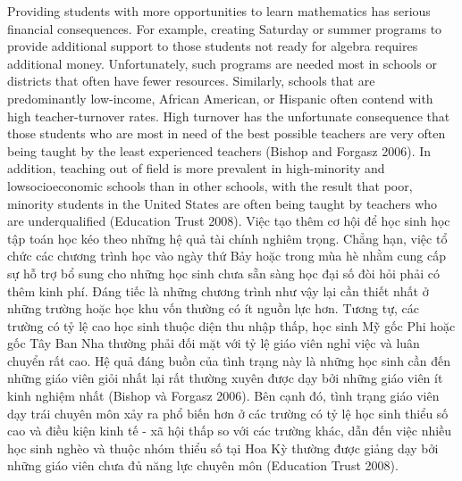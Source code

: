 \documentclass[
  10pt,
  a4paper,
  landscape,
  twoside,
  openany
]{scrbook}
\newcommand{\EN}[1]{#1}
\newcommand{\VI}[1]{#1}
\newcommand{\NOTE}[1]{#1}
\newcounter{example}
\begin{document}
\TriPara
{
\EN{Providing students with more opportunities to learn mathematics has serious financial consequences. For example, creating Saturday or summer programs to provide additional support to those students not ready for algebra requires additional money. Unfortunately, such programs are needed most in schools or districts that often have fewer resources. Similarly, schools that are predominantly low-income, African American, or Hispanic often contend with high teacher-turnover rates. High turnover has the unfortunate consequence that those students who are most in need of the best possible teachers are very often being taught by the least experienced teachers (Bishop and Forgasz 2006). In addition, teaching out of field is more prevalent in high-minority and lowsocioeconomic schools than in other schools, with the result that poor, minority students in the United States are often being taught by teachers who are underqualified (Education Trust 2008).}
}
{
\VI{Việc tạo thêm cơ hội để học sinh học tập toán học kéo theo những hệ quả tài chính nghiêm trọng. Chẳng hạn, việc tổ chức các chương trình học vào ngày thứ Bảy hoặc trong mùa hè nhằm cung cấp sự hỗ trợ bổ sung cho những học sinh chưa sẵn sàng học đại số đòi hỏi phải có thêm kinh phí. Đáng tiếc là những chương trình như vậy lại cần thiết nhất ở những trường hoặc học khu vốn thường có ít nguồn lực hơn. Tương tự, các trường có tỷ lệ cao học sinh thuộc diện thu nhập thấp, học sinh Mỹ gốc Phi hoặc gốc Tây Ban Nha thường phải đối mặt với tỷ lệ giáo viên nghỉ việc và luân chuyển rất cao. Hệ quả đáng buồn của tình trạng này là những học sinh cần đến những giáo viên giỏi nhất lại rất thường xuyên được dạy bởi những giáo viên ít kinh nghiệm nhất (Bishop và Forgasz 2006). Bên cạnh đó, tình trạng giáo viên dạy trái chuyên môn xảy ra phổ biến hơn ở các trường có tỷ lệ học sinh thiểu số cao và điều kiện kinh tế - xã hội thấp so với các trường khác, dẫn đến việc nhiều học sinh nghèo và thuộc nhóm thiểu số tại Hoa Kỳ thường được giảng dạy bởi những giáo viên chưa đủ năng lực chuyên môn (Education Trust 2008).}
}
{
\NOTE{}
}
\end{document}
